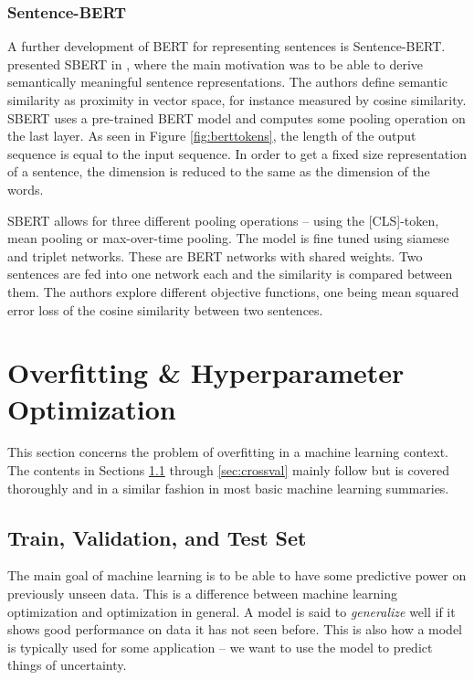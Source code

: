 \subsubsection{Sentence-BERT}

A further development of BERT for representing sentences is Sentence-BERT. \citeauthor{reimers2019sentence} presented SBERT in \citeyear{reimers2019sentence}, where the main motivation was to be able to derive semantically meaningful sentence representations. The authors define semantic similarity as proximity in vector space, for instance measured by cosine similarity. SBERT uses a pre-trained BERT model and computes some pooling operation on the last layer. As seen in Figure \ref{fig:berttokens}, the length of the output sequence is equal to the input sequence. In order to get a fixed size representation of a sentence, the dimension is reduced to the same as the dimension of the words.

SBERT allows for three different pooling operations -- using the \textsc{[CLS]}-token, mean pooling or max-over-time pooling. The model is fine tuned using siamese and triplet networks. These are BERT networks with shared weights. Two sentences are fed into one network each and the similarity is compared between them. The authors explore different objective functions, one being mean squared error loss of the cosine similarity between two sentences. 


\section{Overfitting \& Hyperparameter Optimization}

This section concerns the problem of overfitting in a machine learning context. The contents in Sections \ref{sec:trainvaltest} through \ref{sec:crossval} mainly follow \citeauthor{Goodfellow-et-al-2016} but is covered thoroughly and in a similar fashion in most basic machine learning summaries. 

\subsection{Train, Validation, and Test Set}\label{sec:trainvaltest}

The main goal of machine learning is to be able to have some predictive power on previously unseen data. This is a difference between machine learning optimization and optimization in general. A model is said to \emph{generalize} well if it shows good performance on data it has not seen before. This is also how a model is typically used for some application -- we want to use the model to predict things of uncertainty. 

